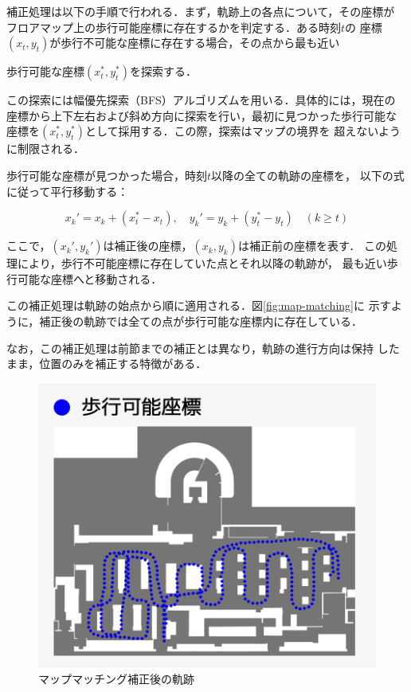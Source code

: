 補正処理は以下の手順で行われる．まず，軌跡上の各点について，その座標が
フロアマップ上の歩行可能座標に存在するかを判定する．ある時刻$t$の
座標$(x_t, y_t)$が歩行不可能な座標に存在する場合，その点から最も近い

歩行可能な座標$(x_t^*, y_t^*)$を探索する．

この探索には幅優先探索（BFS）アルゴリズムを用いる．具体的には，現在の
座標から上下左右および斜め方向に探索を行い，最初に見つかった歩行可能な
座標を$(x_t^*, y_t^*)$として採用する．この際，探索はマップの境界を
超えないように制限される．

歩行可能な座標が見つかった場合，時刻$t$以降の全ての軌跡の座標を，
以下の式に従って平行移動する：

\begin{equation}
x_k' = x_k + (x_t^* - x_t), \quad y_k' = y_k + (y_t^* - y_t) \quad (k \geq t)
\end{equation}

ここで，$(x_k', y_k')$は補正後の座標，$(x_k, y_k)$は補正前の座標を表す．
この処理により，歩行不可能座標に存在していた点とそれ以降の軌跡が，
最も近い歩行可能な座標へと移動される．

この補正処理は軌跡の始点から順に適用される．図\ref{fig:map-matching}に
示すように，補正後の軌跡では全ての点が歩行可能な座標内に存在している．

なお，この補正処理は前節までの補正とは異なり，軌跡の進行方向は保持
したまま，位置のみを補正する特徴がある．

\begin{figure}[H]
    \centering
    \includegraphics[width=\linewidth]{image/walkable-points.jpg}
    \caption{マップマッチング補正後の軌跡}    \label{fig:walkable-points}
\end{figure}

